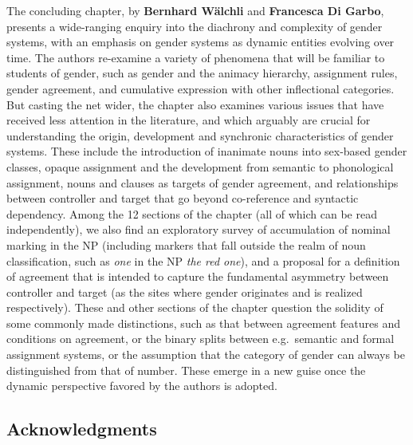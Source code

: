 \documentclass[output=collectionpaper]{langsci/langscibook}
\begin{document}
The concluding chapter, by \textbf{Bernhard Wälchli} and \textbf{Francesca Di Garbo}, presents a wide-ranging enquiry into the diachrony and complexity of gender systems, with an emphasis on gender systems as dynamic entities evolving over time. The authors re-examine a variety of phenomena that will be familiar to students of gender, such as gender and the animacy hierarchy, assignment rules, gender agreement, and cumulative expression with other inflectional categories. But casting the net wider, the chapter also examines various issues that have received less attention in the literature, and which arguably are crucial for understanding the origin, development and synchronic characteristics of gender systems. These include the introduction of inanimate nouns into sex-based gender classes, opaque assignment and the development from semantic to phonological assignment, nouns \textendash{} and clauses \textendash{} as targets of gender agreement, and relationships between controller and target that go beyond co-reference and syntactic dependency. Among the 12 sections of the chapter (all of which can be read independently), we also find an exploratory survey of accumulation of nominal marking in the NP (including markers that fall outside the realm of noun classification, such as \textit{one} in the NP \textit{the red one}), and a proposal for a definition of agreement that is intended to capture the fundamental asymmetry between controller and target (as the sites where gender originates and is realized respectively). These and other sections of the chapter question the solidity of some commonly made distinctions, such as that between agreement features and conditions on agreement, or the binary splits between e.g.\ semantic and formal assignment systems, or the assumption that the category of gender can always be distinguished from that of number. These emerge in a new guise once the dynamic perspective favored by the authors is adopted.

\subsection*{Acknowledgments}
\end{document}
